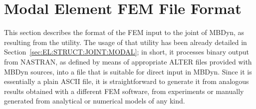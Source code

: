 %
%
%
%
%
% 
%
%

\chapter{Modal Element FEM File Format}
\label{sec:APP:EL:STRUCT:JOINT:MODAL:FORMAT}

This section describes the format of the FEM input to the 
joint of MBDyn, as resulting from the  utility.
The usage of that utility has been already detailed 
in Section~\ref{sec:EL:STRUCT:JOINT:MODAL}; in short, it processes
binary output from NASTRAN, as defined by means of appropriate
ALTER files provided with MBDyn sources, into a file that is suitable
for direct input in MBDyn.
Since it is essentially a plain ASCII file, it is straightforward
to generate it from analogous results obtained with a different 
FEM software, from experiments or manually generated from analytical
or numerical models of any kind.

